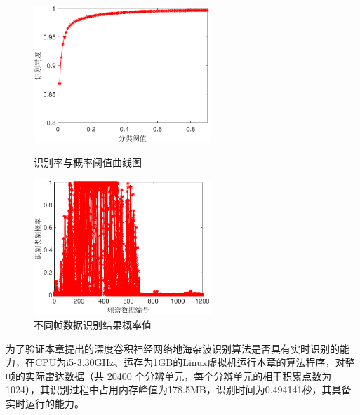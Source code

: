 \begin{figure}[H]
	\centering
	\begin{minipage}{7cm}
		\centering
		\includegraphics[width=6.67cm]{figures/othr/threashold}
		\caption{识别率与概率阈值曲线图}
		\label{fig:threshold}
	\end{minipage}
	\hspace{10pt}
	\begin{minipage}{7cm}
		\centering
		\includegraphics[width=6.67cm]{figures/othr/prob}
		\caption{不同帧数据识别结果概率值}
		\label{fig:prob}
	\end{minipage}

\end{figure}

为了验证本章提出的深度卷积神经网络地海杂波识别算法是否具有实时识别的能力，在CPU为i5-3.30GHz、运存为1GB的Linux虚拟机运行本章的算法程序，对整帧的实际雷达数据（共 20400 个分辨单元，每个分辨单元的相干积累点数为1024），其识别过程中占用内存峰值为178.5MB，识别时间为0.494141秒，其具备实时运行的能力。


